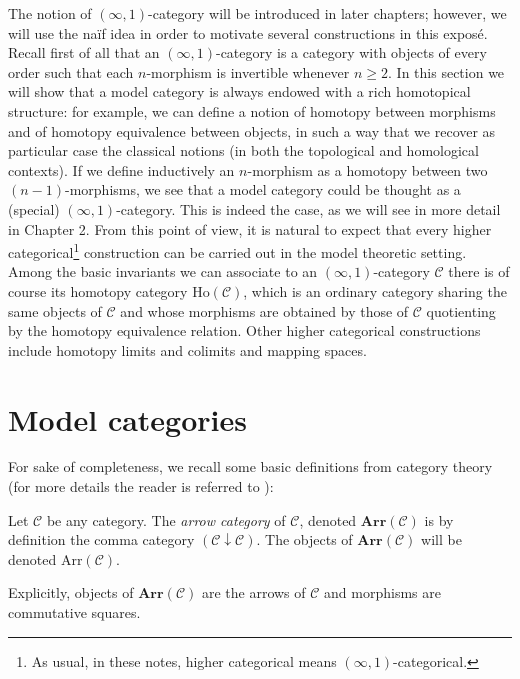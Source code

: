 \begin{refsection}
The notion of $(\infty,1)$-category will be introduced in later chapters; however, we will use the na\"if idea in order to motivate several constructions in this expos\'e. Recall first of all that an $(\infty,1)$-category is a category with objects of every order such that each $n$-morphism is invertible whenever $n \ge 2$. In this section we will show that a model category is always endowed with a rich homotopical structure: for example, we can define a notion of homotopy between morphisms and of homotopy equivalence between objects, in such a way that we recover as particular case the classical notions (in both the topological and homological contexts). If we define inductively an $n$-morphism as a homotopy between two $(n-1)$-morphisms, we see that a model category could be thought as a (special) $(\infty,1)$-category. This is indeed the case, as we will see in more detail in Chapter 2. From this point of view, it is natural to expect that every higher categorical\footnote{As usual, in these notes, higher categorical means $(\infty,1)$-categorical.} construction can be carried out in the model theoretic setting. Among the basic invariants we can associate to an $(\infty,1)$-category $\mathcal C$ there is of course its homotopy category $\mathrm{Ho}(\mathcal C)$, which is an ordinary category sharing the same objects of $\mathcal C$ and whose morphisms are obtained by those of $\mathcal C$ quotienting by the homotopy equivalence relation. Other higher categorical constructions include homotopy limits and colimits and mapping spaces.

\section{Model categories}

For sake of completeness, we recall some basic definitions from category theory (for more details the reader is referred to \cite{cwm}):

\begin{defin}
Let $\mathcal C$ be any category. The \emph{arrow category} of $\mathcal C$, denoted $\mathbf{Arr}(\mathcal C)$ is by definition the comma category $(\mathcal C \downarrow \mathcal C)$. The objects of $\mathbf{Arr}(\mathcal C)$ will be denoted $\mathrm{Arr}(\mathcal C)$.
\end{defin}

\begin{rmk}
Explicitly, objects of $\mathbf{Arr}(\mathcal C)$ are the arrows of $\mathcal C$ and morphisms are commutative squares.
\end{rmk}


\end{refsection}
